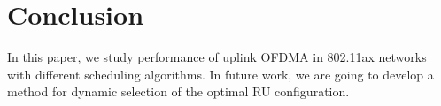 \documentclass[conference]{IEEEtran}
\begin{document}
\section{Conclusion}
\label{sec:conclusion}

In this paper, we study performance of uplink OFDMA in 802.11ax networks with different scheduling algorithms. In future work, we are going to develop a method for dynamic selection of the optimal RU configuration. 

%



\end{document}
